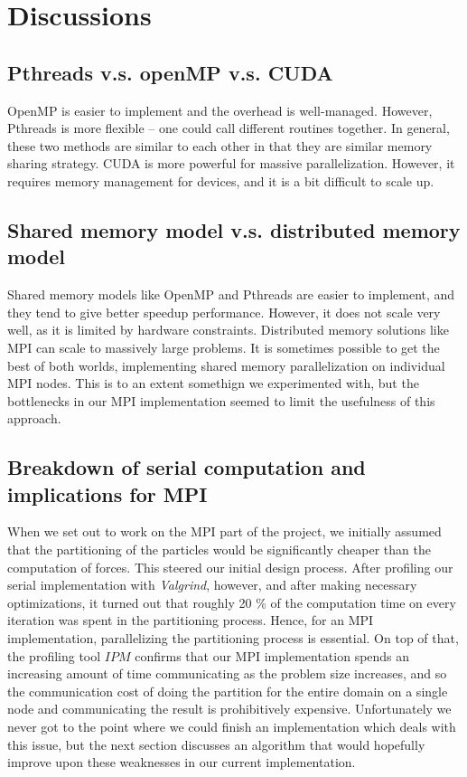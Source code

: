 \documentclass[11pt]{article}
\begin{document}
\section{Discussions}
\subsection{Pthreads v.s. openMP v.s. CUDA}
OpenMP is easier to implement and the overhead is well-managed. However, Pthreads is more flexible -- one could call different routines together. In general, these two methods are similar to each other in that they are similar memory
sharing strategy. CUDA is more powerful for massive parallelization. However, it requires memory management for devices, and it is a bit difficult to scale up.

\subsection{Shared memory model v.s. distributed memory model}
Shared memory models like OpenMP and Pthreads are easier to implement, and they tend to give better speedup performance. However, it does not scale very well, as it is limited by hardware constraints. Distributed memory solutions like MPI can scale to massively large problems. It is sometimes possible to get the best of both worlds, implementing shared memory parallelization on individual MPI nodes. This is to an extent somethign we experimented with, but the bottlenecks in our MPI implementation seemed to limit the usefulness of this approach.

\subsection{Breakdown of serial computation and implications for MPI}
When we set out to work on the MPI part of the project, we initially assumed that the partitioning of the particles would be significantly cheaper than the computation of forces. This steered our initial design process. After profiling our serial implementation with \emph{Valgrind}, however, and after making necessary optimizations, it turned out that roughly 20 \% of the computation time on every iteration was spent in the partitioning process. Hence, for an MPI implementation, parallelizing the partitioning process is essential. On top of that, the profiling tool $IPM$ confirms that our MPI implementation spends an increasing amount of time communicating as the problem size increases, and so the communication cost of doing the partition for the entire domain on a single node and communicating the result is prohibitively expensive. Unfortunately we never got to the point where we could finish an implementation which deals with this issue, but the next section discusses an algorithm that would hopefully improve upon these weaknesses in our current implementation.
\end{document}
